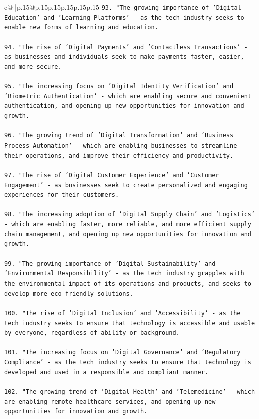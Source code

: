 \documentclass{article}
\begin{document}
{\begin{supertabular}{c@{$\;$}|p{.15\linewidth}@{}p{.15\linewidth}p{.15\linewidth}p{.15\linewidth}p{.15\linewidth}p{.15\linewidth}}
{{{\texttt{93. "The growing importance of 'Digital Education' and 'Learning Platforms' {-} as the tech industry seeks to enable new forms of learning and education.} \\
\\ 
\texttt{94. "The rise of 'Digital Payments' and 'Contactless Transactions' {-} as businesses and individuals seek to make payments faster, easier, and more secure.} \\
\\ 
\texttt{95. "The increasing focus on 'Digital Identity Verification' and 'Biometric Authentication' {-} which are enabling secure and convenient authentication, and opening up new opportunities for innovation and growth.} \\
\\ 
\texttt{96. "The growing trend of 'Digital Transformation' and 'Business Process Automation' {-} which are enabling businesses to streamline their operations, and improve their efficiency and productivity.} \\
\\ 
\texttt{97. "The rise of 'Digital Customer Experience' and 'Customer Engagement' {-} as businesses seek to create personalized and engaging experiences for their customers.} \\
\\ 
\texttt{98. "The increasing adoption of 'Digital Supply Chain' and 'Logistics' {-} which are enabling faster, more reliable, and more efficient supply chain management, and opening up new opportunities for innovation and growth.} \\
\\ 
\texttt{99. "The growing importance of 'Digital Sustainability' and 'Environmental Responsibility' {-} as the tech industry grapples with the environmental impact of its operations and products, and seeks to develop more eco{-}friendly solutions.} \\
\\ 
\texttt{100. "The rise of 'Digital Inclusion' and 'Accessibility' {-} as the tech industry seeks to ensure that technology is accessible and usable by everyone, regardless of ability or background.} \\
\\ 
\texttt{101. "The increasing focus on 'Digital Governance' and 'Regulatory Compliance' {-} as the tech industry seeks to ensure that technology is developed and used in a responsible and compliant manner.} \\
\\ 
\texttt{102. "The growing trend of 'Digital Health' and 'Telemedicine' {-} which are enabling remote healthcare services, and opening up new opportunities for innovation and growth.} \\
}}}
\end{supertabular}}
\end{document}
